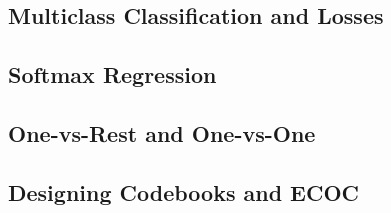 

\subsection{Multiclass Classification and Losses}


\subsection{Softmax Regression}


\subsection{One-vs-Rest and One-vs-One}


\subsection{Designing Codebooks and ECOC}



